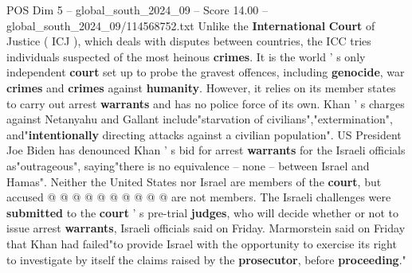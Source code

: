 \begin{textsample}{POS Dim 5 – global\_south\_2024\_09 – Score 14.00 – global\_south\_2024\_09/114568752.txt}
Unlike the \textbf{International} \textbf{Court} of Justice ( ICJ ), which deals with disputes between countries, the ICC tries individuals suspected of the most heinous \textbf{crimes}.
It is the world ' s only independent \textbf{court} set up to probe the gravest offences, including \textbf{genocide}, war \textbf{crimes} and \textbf{crimes} against \textbf{humanity}.
However, it relies on its member states to carry out arrest \textbf{warrants} and has no police force of its own.
Khan ' s charges against Netanyahu and Gallant include"starvation of civilians","extermination", and"\textbf{intentionally} directing attacks against a civilian population".
US President Joe Biden has denounced Khan ' s bid for arrest \textbf{warrants} for the Israeli officials as"outrageous", saying"there is no equivalence -- none -- between Israel and Hamas".
Neither the United States nor Israel are members of the \textbf{court}, but accused @ @ @ @ @ @ @ @ @ @ are not members.
The Israeli challenges were \textbf{submitted} to the \textbf{court} ' s pre-trial \textbf{judges}, who will decide whether or not to issue arrest \textbf{warrants}, Israeli officials said on Friday.
Marmorstein said on Friday that Khan had failed"to provide Israel with the opportunity to exercise its right to investigate by itself the claims raised by the \textbf{prosecutor}, before \textbf{proceeding}."

\end{textsample}
